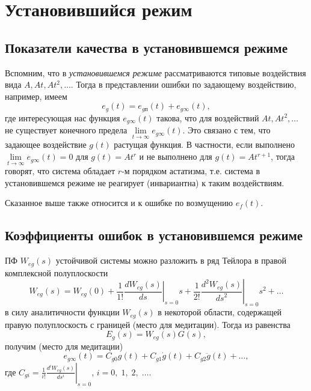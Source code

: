 \documentclass[../../TAU.tex]{subfiles}
\begin{document}

\section{Установившийся режим}

\subsection{Показатели качества в установившемся режиме }

    Вспомним, что в {\it установившемся режиме} рассматриваются типовые воздействия вида $A,At, At^2, \ldots$. Тогда в представлении ошибки по задающему воздействию, например, имеем
    $$
        e_g(t) = e_{gп}(t) + e_{g\infty}(t),
    $$
    где интересующая нас функция $e_{g\infty}(t)$ такова, что для воздействий $At, At^2, \ldots$ не существует конечного предела $\lim\limits_{t\rightarrow\infty} e_{g\infty}(t)$. Это связано с тем, что задающее воздействие $g(t)$ растущая функция. В частности, если выполнено $\lim\limits_{t\rightarrow\infty} e_{g\infty}(t)=0$ для $g(t) = At^r$ и не выполнено для $g(t) = At^{r+1}$, тогда говорят, что система обладает $r$-м порядком астатизма, т.е. система в установившемся режиме не реагирует (инвариантна) к таким воздействиям.

    Сказанное выше также относится и к ошибке по возмущению $e_f(t)$.

\subsection{Коэффициенты ошибок в установившемся режиме}

    ПФ $W_{eg}(s) $ устойчивой системы можно разложить в ряд Тейлора в правой комплексной полуплоскости
    $$
        W_{eg}(s) = W_{eg}(0) + \frac{1}{1!}\left.\frac{dW_{eg}(s)}{ds}\right|_{s=0}s + \frac{1}{2!}\left.\frac{d^2W_{eg}(s)}{{ds}^2}\right|_{s=0}s^2 + \ldots
    $$
    в силу аналитичности функции $W_{eg}(s)$ в некоторой области, содержащей правую полуплоскость с границей (место для медитации). Тогда из равенства
    $$
        E_g(s) = W_{eg}(s) G(s),
    $$
    получим (место для медитации)
    $$
        e_{g\infty}(t) = C_{g0} g(t) + C_{g1} \dot g(t) + C_{g2} \ddot g(t) + \ldots,
    $$
    где $C_{gi} =\frac{1}{i!}\left.\frac{d^iW_{eg}(s)}{ds^i}\right|_{s=0}$, $i=0,\;1,\;2,\;\ldots$.
\end{document}
